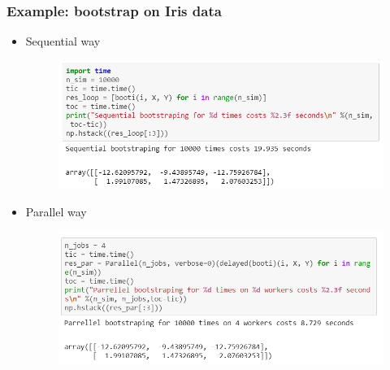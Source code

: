 \documentclass[red]{beamer}
\begin{document}
\begin{frame}
\frametitle{Example: bootstrap on Iris data}
\begin{itemize}
	\item Sequential way 
	\vspace{-1mm}
	\begin{figure}
		\centering
		\includegraphics[width=0.85\linewidth]{figure/screenshot028}
	\end{figure}
	
	\vspace{-2mm}
	\item Parallel way
	\vspace{-1mm}
	\begin{figure}
		\centering
		\includegraphics[width=0.85\linewidth]{figure/screenshot029}
	\end{figure}
	
\end{itemize}
\end{frame}
\end{document}
